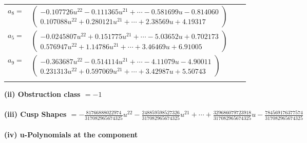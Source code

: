 \documentclass[1p]{elsarticle_modified}
\theoremstyle{definition}
\begin{document}
\begin{tabular}{m{7pt} m{180pt} m{7pt} m{180pt} }
\flushright $a_{8}=$&$\begin{pmatrix}-0.107726 u^{22}-0.111365 u^{21}+\cdots-0.581699 u-0.814060\\0.107088 u^{22}+0.280121 u^{21}+\cdots+2.38569 u+4.19317\end{pmatrix}$ \\
\flushright $a_{5}=$&$\begin{pmatrix}-0.0245807 u^{22}+0.151775 u^{21}+\cdots-5.03652 u+0.702173\\0.576947 u^{22}+1.14786 u^{21}+\cdots+3.46469 u+6.91005\end{pmatrix}$ \\
\flushright $a_{9}=$&$\begin{pmatrix}-0.363687 u^{22}-0.514114 u^{21}+\cdots-4.11079 u-4.90011\\0.231313 u^{22}+0.597069 u^{21}+\cdots+3.42987 u+5.50743\end{pmatrix}$\\&\end{tabular}
\flushleft \textbf{(ii) Obstruction class $= -1$}\\~\\
\flushleft \textbf{(iii) Cusp Shapes $= -\frac{81766888022974}{317082965674325} u^{22}-\frac{248859598527326}{317082965674325} u^{21}+\cdots+\frac{329686079723918}{317082965674325} u-\frac{784569176377574}{317082965674325}$}\\~\\
\newpage\renewcommand{\arraystretch}{1}
\flushleft \textbf{(iv) u-Polynomials at the component}\newline \\
\end{document}
